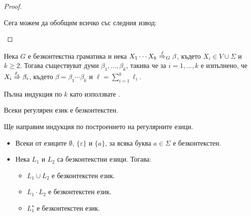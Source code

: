 \begin{proof}
\begin{itemize}
  Сега можем да обобщим всичко със следния извод:
  \begin{prooftree}
  \end{prooftree}
\end{itemize}
\end{proof}

\begin{proposition}\label{pr:grammar:divide}
  Нека $G$ е безконтекстна граматика и нека $X_1\cdots X_k \derive{\ell}_G \beta$, където $X_i \in V \cup \Sigma$ и $k \geq 2$.
  Тогава съществуват думи $\beta_1,\dots,\beta_k$, такива че за $i = 1,\dots, k$ е изпълнено, че
  $X_i \derive{\ell_i} \beta_i$, където $\beta = \beta_1\cdots \beta_k$ и $\ell = \sum^k_{i = 1}\ell_i$.
\end{proposition}
\begin{hint}
  Пълна индукция по $k$ като използвате .
\end{hint}
  
\begin{important}
  \begin{theorem}
    Всеки регулярен език е безконтекстен.
  \end{theorem}
\end{important}
\begin{hint}
  Ще направим индукция по построението на регулярните езици.
  \begin{itemize}
  \item
    Всеки от езиците $\emptyset$, $\{\varepsilon\}$ и $\{a\}$, за всяка буква $a \in \Sigma$ е безконтекстен.
  \item
    Нека $L_1$ и $L_2$ са безконтекстни езици. Тогава:
    \begin{itemize}
    \item
      $L_1 \cup L_2$ е безконтекстен език.
    \item
      $L_1 \cdot L_2$ е безконтекстен език.
    \item
      $L^\star_1$ е безконтекстен език.
    \end{itemize}
  \end{itemize}
\end{hint}


